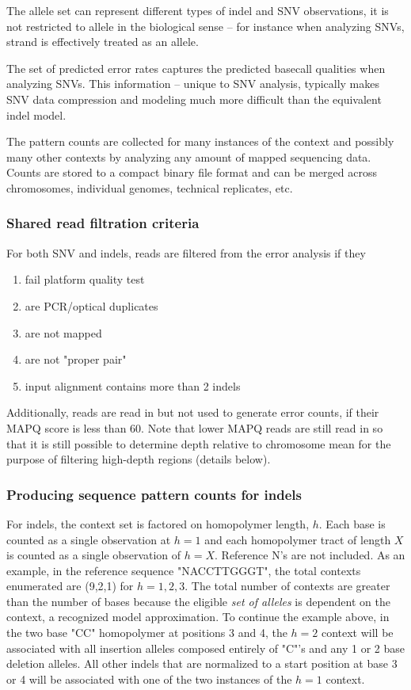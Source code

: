 \documentclass{article}
\begin{document}
The allele set can represent different types of indel and SNV observations, it is not restricted to allele in the biological sense -- for instance when analyzing SNVs, strand is effectively treated as an allele.

The set of predicted error rates captures the predicted basecall qualities when analyzing SNVs. This information -- unique to SNV analysis, typically makes SNV data compression and modeling much more difficult than the equivalent indel model.

The pattern counts are collected for many instances of the context and possibly many other contexts by analyzing any amount of mapped sequencing data. Counts are stored to a compact binary file format and can be merged across chromosomes, individual genomes, technical replicates, etc.

\subsubsection{Shared read filtration criteria}

For both SNV and indels, reads are filtered from the error analysis if they

\begin{enumerate}
	\item fail platform quality test
	\item are PCR/optical duplicates
	\item are not mapped
	\item are not "proper pair"
	\item input alignment contains more than 2 indels
\end{enumerate}

Additionally, reads are read in but not used to generate error counts, if their MAPQ score is less than 60. Note that lower MAPQ reads are still read in so that it is still possible to determine depth relative to chromosome mean for the purpose of filtering high-depth regions (details below).

\subsubsection{Producing sequence pattern counts for indels}

For indels, the context set is factored on homopolymer length, $h$. Each base is counted as a single observation at $h=1$ and each homopolymer tract of length $X$ is counted as a single observation of $h=X$. Reference N's are not included. As an example, in the reference sequence "NACCTTGGGT", the total contexts enumerated are (9,2,1) for $h=1,2,3$. The total number of contexts are greater than the number of bases because the eligible \emph{set of alleles} is dependent on the context, a recognized model approximation. To continue the example above, in the two base "CC" homopolymer at positions 3 and 4, the $h=2$ context will be associated with all insertion alleles composed entirely of "C"'s and any 1 or 2 base deletion alleles. All other indels that are normalized to a start position at base 3 or 4 will be associated with one of the two instances of the $h=1$ context.
\end{document}
